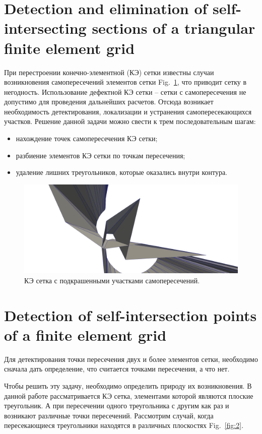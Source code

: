 \documentclass[
11pt,%
tightenlines,%
twoside,%
onecolumn,%
nofloats,%
nobibnotes,%
nofootinbib,%
superscriptaddress,%
noshowpacs,%
centertags]%
{revtex4}
\begin{document}
\section{Detection and elimination of self-intersecting sections of a triangular finite element grid}

При перестроении конечно-элементной (КЭ) сетки известны случаи возникновения самопересечений элементов сетки Fig.~\ref{fig:1}, что приводит сетку в негодность. Использование дефектной КЭ сетки – сетки с самопересечения не допустимо для проведения дальнейших расчетов. Отсюда возникает необходимость детектирования, локализации и устранения самопересекающихся участков.
Решение данной задачи можно свести к трем последовательным шагам:

\begin{itemize}
  \item нахождение точек самопересечения КЭ сетки;
  \item разбиение элементов КЭ сетки по точкам пересечения;
  \item удаление лишних треугольников, которые оказались внутри контура.
\end{itemize}

\begin{figure}[h]
\includegraphics[width=1.0\textwidth]{pics/pic_1.png}
\caption{КЭ сетка с подкрашенными участками самопересечений.}\label{fig:1}
\end{figure}

\section{Detection of self-intersection points of a finite element grid}

Для детектирования точки пересечения двух и более элементов сетки, необходимо сначала дать определение, что считается точками пересечения, а что нет.

Чтобы решить эту задачу, необходимо определить природу их возникновения.
В данной работе рассматривается КЭ сетка, элементами которой являются плоские треугольник. А при пересечении одного треугольника с другим как раз и возникают различные точки пересечений.
Рассмотрим случай, когда пересекающиеся треугольники находятся в различных плоскостях Fig.~\ref{fig:2}. 
\end{document}

